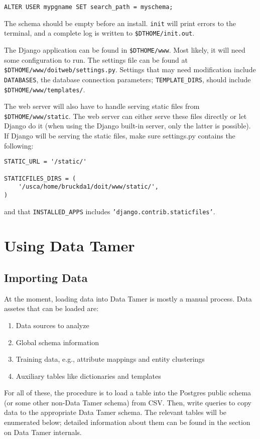 \documentclass[12pt]{article}
\begin{document}
\texttt{ALTER USER mypgname SET search\_path = myschema;}

The schema should be empty before an install.  \texttt{init} will print errors to the terminal, and a complete log is written to \texttt{\$DTHOME/init.out}.

The Django application can be found in \texttt{\$DTHOME/www}.  Most likely, it will need some configuration to run.  The settings file can be found at \texttt{\$DTHOME/www/doitweb/settings.py}.  Settings that may need modification include \texttt{DATABASES}, the database connection parameters; \texttt{TEMPLATE\_DIRS}, should include \texttt{\$DTHOME/www/templates/}.

The web server will also have to handle serving static files from \texttt{\$DTHOME/www/static}.  The web server can either serve these files directly or let Django do it (when using the Django built-in server, only the latter is possible).  If Django will be serving the static files, make sure settings.py contains the following:

\begin{verbatim}
STATIC_URL = '/static/'

STATICFILES_DIRS = (
    '/usca/home/bruckda1/doit/www/static/',
)
\end{verbatim}

and that \texttt{INSTALLED\_APPS} includes \texttt{'django.contrib.staticfiles'}.


\section{Using Data Tamer}

\subsection{Importing Data}

At the moment, loading data into Data Tamer is mostly a manual process.  Data assetes that can be loaded are:

\begin{enumerate}
\item Data sources to analyze
\item Global schema information
\item Training data, e.g., attribute mappings and entity clusterings
\item Auxiliary tables like dictionaries and templates
\end{enumerate}

For all of these, the procedure is to load a table into the Postgres public schema (or some other non-Data Tamer schema) from CSV.  Then, write queries to copy data to the appropriate Data Tamer schema.  The relevant tables will be enumerated below; detailed information about them can be found in the section on Data Tamer internals.
\end{document}
